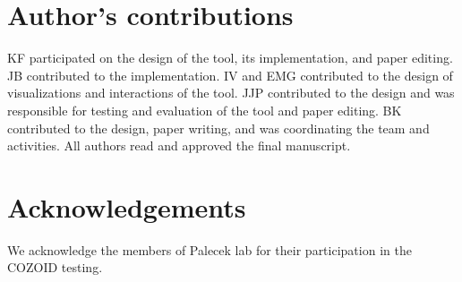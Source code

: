 \documentclass[twocolumn]{bmcart}%
\begin{document}
\begin{backmatter}
\section*{Author's contributions}
KF participated on the design of the tool, its implementation, and paper editing. JB contributed to the implementation. IV and EMG contributed to the design of visualizations and interactions of the tool. JJP contributed to the design and was responsible for testing and evaluation of the tool and paper editing. BK contributed to the design, paper writing, and was coordinating the team and activities. All authors read and approved the final manuscript.

\section*{Acknowledgements}
We acknowledge the members of Palecek lab for their participation in the COZOID testing. 






\end{backmatter}
\end{document}
